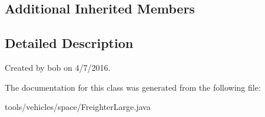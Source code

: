 \subsection*{Additional Inherited Members}


\subsection{Detailed Description}
Created by bob on 4/7/2016. 

The documentation for this class was generated from the following file\+:\begin{DoxyCompactItemize}
\item 
tools/vehicles/space/Freighter\+Large.\+java\end{DoxyCompactItemize}
